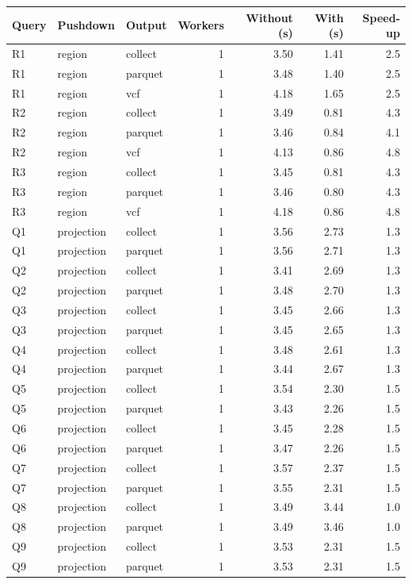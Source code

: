 \begin{tabular}{lllrrrr}
\toprule
Query & Pushdown & Output & Workers & Without (s) & With (s) & Speed-up \\
\midrule
R1 & region & collect & 1 & 3.50 & 1.41 & 2.5 \\
R1 & region & parquet & 1 & 3.48 & 1.40 & 2.5 \\
R1 & region & vcf & 1 & 4.18 & 1.65 & 2.5 \\
R2 & region & collect & 1 & 3.49 & 0.81 & 4.3 \\
R2 & region & parquet & 1 & 3.46 & 0.84 & 4.1 \\
R2 & region & vcf & 1 & 4.13 & 0.86 & 4.8 \\
R3 & region & collect & 1 & 3.45 & 0.81 & 4.3 \\
R3 & region & parquet & 1 & 3.46 & 0.80 & 4.3 \\
R3 & region & vcf & 1 & 4.18 & 0.86 & 4.8 \\
Q1 & projection & collect & 1 & 3.56 & 2.73 & 1.3 \\
Q1 & projection & parquet & 1 & 3.56 & 2.71 & 1.3 \\
Q2 & projection & collect & 1 & 3.41 & 2.69 & 1.3 \\
Q2 & projection & parquet & 1 & 3.48 & 2.70 & 1.3 \\
Q3 & projection & collect & 1 & 3.45 & 2.66 & 1.3 \\
Q3 & projection & parquet & 1 & 3.45 & 2.65 & 1.3 \\
Q4 & projection & collect & 1 & 3.48 & 2.61 & 1.3 \\
Q4 & projection & parquet & 1 & 3.44 & 2.67 & 1.3 \\
Q5 & projection & collect & 1 & 3.54 & 2.30 & 1.5 \\
Q5 & projection & parquet & 1 & 3.43 & 2.26 & 1.5 \\
Q6 & projection & collect & 1 & 3.45 & 2.28 & 1.5 \\
Q6 & projection & parquet & 1 & 3.47 & 2.26 & 1.5 \\
Q7 & projection & collect & 1 & 3.57 & 2.37 & 1.5 \\
Q7 & projection & parquet & 1 & 3.55 & 2.31 & 1.5 \\
Q8 & projection & collect & 1 & 3.49 & 3.44 & 1.0 \\
Q8 & projection & parquet & 1 & 3.49 & 3.46 & 1.0 \\
Q9 & projection & collect & 1 & 3.53 & 2.31 & 1.5 \\
Q9 & projection & parquet & 1 & 3.53 & 2.31 & 1.5 \\

\end{tabular}
